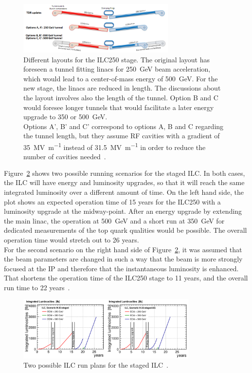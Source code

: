 \begin{figure}[H]
\centering
\includegraphics[width=0.7\textwidth]{Figures/Staging.png}
\caption[Different layouts for the ILC250 stage]{Different layouts for the ILC250 stage.
The original layout has foreseen a tunnel fitting linacs for \SI{250}{\GeV} beam acceleration, which would lead to a center-of-mass energy of \SI{500}{\GeV}.
For the new stage, the linacs are reduced in length.
The discussions about the layout involves also the length of the tunnel.
Option B and C would foresee longer tunnels that would facilitate a later energy upgrade to 350 or \SI{500}{\GeV}.\\
Options A', B' and C' correspond to options A, B and C regarding the tunnel length, but they assume RF cavities with a gradient of \SI{35}{\mega\volt\per\meter} instead of \SI{31.5}{\mega\volt\per\meter} in order to reduce the number of cavities needed~\cite[p. 19]{Staging}.}
\label{fig:Staging}
\end{figure}
Figure~\ref{fig:ILC_runningtime} shows two possible running scenarios for the staged ILC.
In both cases, the ILC will have energy and luminosity upgrades, so that it will reach the same integrated luminosity over a different amount of time.
On the left hand side, the plot shows an expected operation time of 15 years for the ILC250 with a luminosity upgrade at the midway-point.
After an energy upgrade by extending the main linac, the operation at \SI{500}{\GeV} and a short run at \SI{350}{\GeV} for dedicated measurements of the top quark qualities would be possible.
The overall operation time would stretch out to 26 years.\\
For the second scenario on the right hand side of Figure~\ref{fig:ILC_runningtime}, it was assumed that the beam parameters are changed in such a way that the beam is more strongly focused at the IP and therefore that the instantaneous luminosity is enhanced.
That shortens the operation time of the ILC250 stage to 11 years, and the overall run time to 22 years~\cite[p. 7]{PhysicsCase}.
\begin{figure}[h]
\centering
\includegraphics[width=0.8\textwidth]{Figures/ILC_runningtime.png}
\caption[ILC run plan]{Two possible ILC run plans for the staged ILC~\cite[p. 8]{PhysicsCase}.}
\label{fig:ILC_runningtime}
\end{figure}
\newpage
